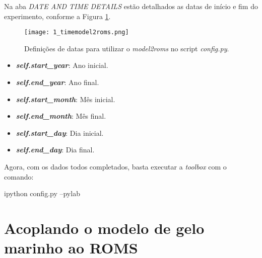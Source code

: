 \noindent Na aba \textit{DATE AND TIME DETAILS} estão detalhados as datas de início e fim do experimento, conforme a Figura \textcolor{bleu_cite}{\ref{datetimemodel2roms}}.
\bigskip

\begin{figure}[H]
    \centering
    \captionsetup{justification=centering}
    \texttt{[image: 1\_timemodel2roms.png]}
    \caption{Definições de datas para utilizar o \textit{model2roms} no script \textit{config.py}.}
    \label{datetimemodel2roms}
\end{figure}
\bigskip

\begin{itemize}
\item \textbf{\textit{self.start\_year}}: Ano inicial.
\item \textbf{\textit{self.end\_year}}: Ano final.
\item \textbf{\textit{self.start\_month}}: Mês inicial.
\item \textbf{\textit{self.end\_month}}: Mês final.
\item \textbf{\textit{self.start\_day}}: Dia inicial.
\item \textbf{\textit{self.end\_day}}: Dia final.
\end{itemize}
\bigskip

\noindent Agora, com os dados todos completados, basta executar a \textit{toolbox} com o comando:
\bigskip

\begin{bashcode}
ipython config.py --pylab
\end{bashcode}

\section{Acoplando o modelo de gelo marinho ao ROMS}
\bigskip
